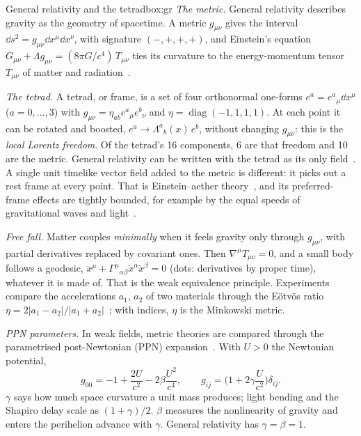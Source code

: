 \begin{primer}{General relativity and the tetrad}{box:gr}
\setlength{\parskip}{3pt plus 1pt}%
\emph{The metric.} General relativity describes gravity as the geometry of spacetime. A metric $g_{\mu\nu}$ gives the interval
$\dd s^2=g_{\mu\nu}\dd x^\mu\dd x^\nu$, with signature $(-,+,+,+)$, and Einstein's equation
$G_{\mu\nu}+\Lambda g_{\mu\nu}=(8\pi G/c^4)\,T_{\mu\nu}$ ties its curvature to the energy-momentum tensor $T_{\mu\nu}$ of matter and
radiation~\cite{wald1984}.

\emph{The tetrad.} A tetrad, or frame, is a set of four orthonormal one-forms $e^a=e^a{}_\mu\dd x^\mu$ ($a=0,\dots,3$) with
$g_{\mu\nu}=\eta_{ab}e^a{}_\mu e^b{}_\nu$ and $\eta=\operatorname{diag}(-1,1,1,1)$. At each point it can be rotated and boosted,
${e^a\to\Lambda^a{}_b(x)\,e^b}$, without changing $g_{\mu\nu}$: this is the \emph{local Lorentz freedom}. Of the tetrad's 16 components, 6 are
that freedom and 10 are the metric. General relativity can be written with the tetrad as its only field~\cite{aldrovandi}. A single unit
timelike vector field added to the metric is different: it picks out a rest frame at every point. That is Einstein--aether
theory~\cite{aether}, and its preferred-frame effects are tightly bounded, for example by the equal speeds of gravitational waves and
light~\cite{gw170817}.

\emph{Free fall.} Matter couples \emph{minimally} when it feels gravity only through $g_{\mu\nu}$, with partial derivatives replaced by
covariant ones. Then $\nabla^\mu T_{\mu\nu}=0$, and a small body follows a geodesic,
$\ddot x^\mu+\Gamma^\mu{}_{\alpha\beta}\dot x^\alpha\dot x^\beta=0$ (dots: derivatives by proper time), whatever it is made of. That is the
weak equivalence principle. Experiments compare the accelerations $a_1$, $a_2$ of two materials through the E\"otv\"os ratio
${\eta=2|a_1-a_2|/|a_1+a_2|}$~\cite{microscope}; with indices, $\eta$ is the Minkowski metric.

\emph{PPN parameters.} In weak fields, metric theories are compared through the parametrised post-Newtonian (PPN) expansion~\cite{will}.
With $U>0$ the Newtonian potential,
\[
g_{00}=-1+\frac{2U}{c^2}-2\beta\frac{U^2}{c^4},\qquad g_{ij}=\Big(1+2\gamma\frac{U}{c^2}\Big)\delta_{ij}.
\]
$\gamma$ says how much space curvature a unit mass produces; light bending and the Shapiro delay scale as $(1+\gamma)/2$. $\beta$ measures
the nonlinearity of gravity and enters the perihelion advance with $\gamma$. General relativity has $\gamma=\beta=1$.


\end{primer}
